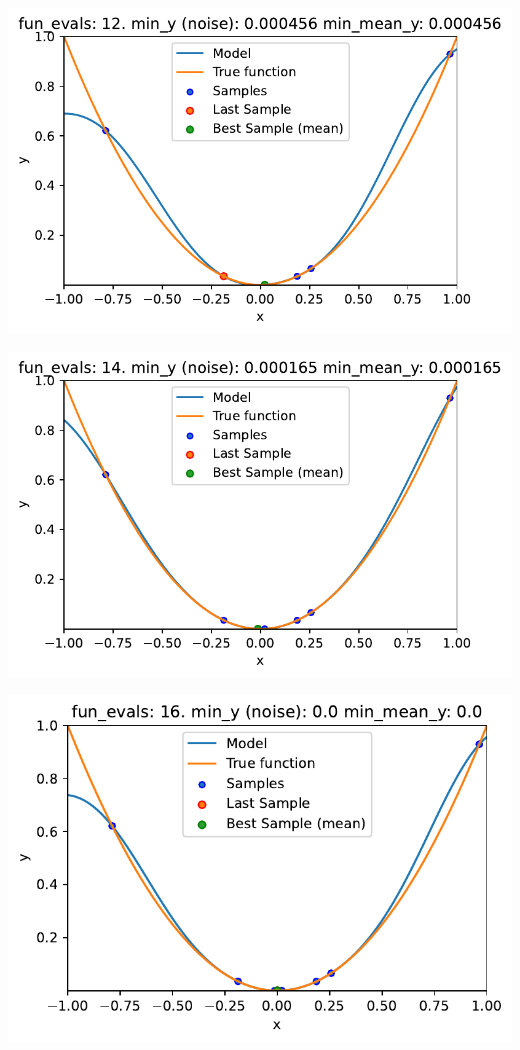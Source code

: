 \documentclass[
  letterpaper,
  DIV=11,
  numbers=noendperiod]{scrreprt}
\begin{document}
\includegraphics{014_num_spot_ocba_files/figure-pdf/cell-6-output-5.pdf}

\includegraphics{014_num_spot_ocba_files/figure-pdf/cell-6-output-6.pdf}

\includegraphics{014_num_spot_ocba_files/figure-pdf/cell-6-output-7.pdf}
\end{document}
